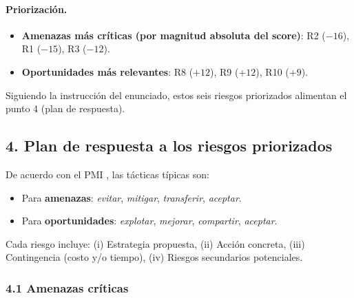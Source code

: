 \paragraph{Priorización.}
\begin{itemize}
  \item \textbf{Amenazas más críticas (por magnitud absoluta del score)}:
  R2 ($-16$), R1 ($-15$), R3 ($-12$). 
  \item \textbf{Oportunidades más relevantes}:
  R8 ($+12$), R9 ($+12$), R10 ($+9$).
\end{itemize}

Siguiendo la instrucción del enunciado, estos seis riesgos priorizados alimentan el punto 4 (plan de respuesta).



\subsection{4. Plan de respuesta a los riesgos priorizados}

De acuerdo con el PMI \cite{PMBOK}, las tácticas típicas son:
\begin{itemize}
  \item Para \textbf{amenazas}: \textit{evitar}, \textit{mitigar}, \textit{transferir}, \textit{aceptar}.
  \item Para \textbf{oportunidades}: \textit{explotar}, \textit{mejorar}, \textit{compartir}, \textit{aceptar}.
\end{itemize}

Cada riesgo incluye:
(i) Estrategia propuesta,
(ii) Acción concreta,
(iii) Contingencia (costo y/o tiempo),
(iv) Riesgos secundarios potenciales.

\subsubsection*{4.1 Amenazas críticas}

